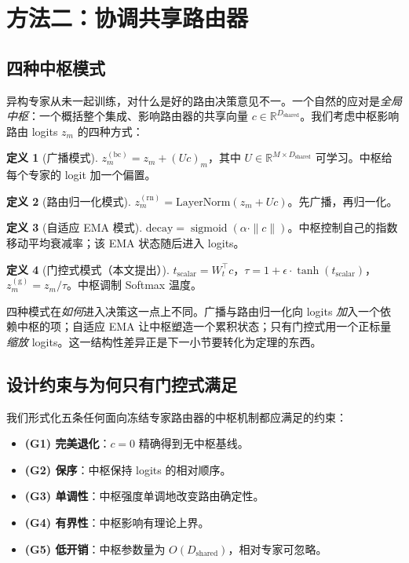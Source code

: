 \documentclass[10pt,twoside]{article}
\newcommand{\sigmoid}{\operatorname{sigmoid}}
\newcommand{\R}{\mathbb{R}}
\theoremstyle{definition}
\newtheorem{definition}{定义}[section]
\theoremstyle{plain}
\theoremstyle{remark}
\begin{document}
\section{方法二：协调共享路由器}
\label{sec:hub}

\subsection{四种中枢模式}
\label{sec:modes}

异构专家从未一起训练，对什么是好的路由决策意见不一。一个自然的应对是\emph{全局中枢}：一个概括整个集成、影响路由器的共享向量 $c \in \R^{D_{\text{shared}}}$。我们考虑中枢影响路由 logits $z_m$ 的四种方式：

\begin{definition}[广播模式]
$z_m^{(\text{bc})} = z_m + (U c)_m$，其中 $U \in \R^{M \times D_{\text{shared}}}$ 可学习。中枢给每个专家的 logit 加一个偏置。
\end{definition}

\begin{definition}[路由归一化模式]
$z_m^{(\text{rn})} = \mathrm{LayerNorm}(z_m + U c)$。先广播，再归一化。
\end{definition}

\begin{definition}[自适应 EMA 模式]
$\text{decay} = \sigmoid(\alpha \cdot \|c\|)$。中枢控制自己的指数移动平均衰减率；该 EMA 状态随后进入 logits。
\end{definition}

\begin{definition}[门控式模式（本文提出）]
$t_{\text{scalar}} = W_t^\top c$，$\tau = 1 + \epsilon \cdot \tanh(t_{\text{scalar}})$，$z_m^{(\text{g})} = z_m / \tau$。中枢调制 Softmax 温度。
\end{definition}

四种模式在\emph{如何}进入决策这一点上不同。广播与路由归一化向 logits \emph{加}入一个依赖中枢的项；自适应 EMA 让中枢塑造一个累积状态；只有门控式用一个正标量\emph{缩放} logits。这一结构性差异正是下一小节要转化为定理的东西。

\subsection{设计约束与为何只有门控式满足}
\label{sec:theory}

我们形式化五条任何面向冻结专家路由器的中枢机制都应满足的约束：
\begin{itemize}[leftmargin=1.5em, itemsep=1pt]
    \item \textbf{(G1) 完美退化}：$c=0$ 精确得到无中枢基线。
    \item \textbf{(G2) 保序}：中枢保持 logits 的相对顺序。
    \item \textbf{(G3) 单调性}：中枢强度单调地改变路由确定性。
    \item \textbf{(G4) 有界性}：中枢影响有理论上界。
    \item \textbf{(G5) 低开销}：中枢参数量为 $O(D_{\text{shared}})$，相对专家可忽略。
\end{itemize}
\end{document}
